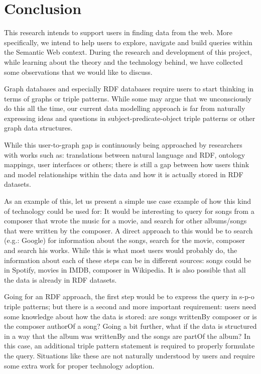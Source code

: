 \chapter{Conclusion}
\label{chap:Conclusion}

This research intends to support users in finding data from the web. More specifically, we intend to help users to explore, navigate and build queries within the Semantic Web context. During the research and development of this project, while learning about the theory and the technology behind, we have collected some observations that we would like to discuss.

Graph databases and especially RDF databases require users to start thinking in terms of graphs or triple patterns. While some may argue that we unconsciously do this all the time, our current data modelling approach is far from naturally expressing ideas and questions in subject-predicate-object triple patterns or other graph data structures.

While this user-to-graph gap is continuously being approached by researchers with works such as: translations between natural language and RDF, ontology mappings, user interfaces or others; there is still a gap between how users think and model relationships within the data and how it is actually stored in RDF datasets.

As an example of this, let us present a simple use case example of how this kind of technology could be used for: It would be interesting to query for songs from a composer that wrote the music for a movie, and search for other albums/songs that were written by the composer. A direct approach to this would be to search (e.g.: Google) for information about the songs, search for the movie, composer and search his works. While this is what most users would probably do, the information about each of these steps can be in different sources: songs could be in Spotify, movies in IMDB, composer in Wikipedia. It is also possible that all the data is already in RDF datasets.

Going for an RDF approach, the first step would be to express the query in s-p-o triple patterns; but there is a second and more important requirement: users need some knowledge about how the data is stored: are songs writtenBy composer or is the composer authorOf a song? Going a bit further, what if the data is structured in a way that the album was writtenBy and the songs are partOf the album? In this case, an additional triple pattern statement is required to properly formulate the query. Situations like these are not naturally understood by users and require some extra work for proper technology adoption.

